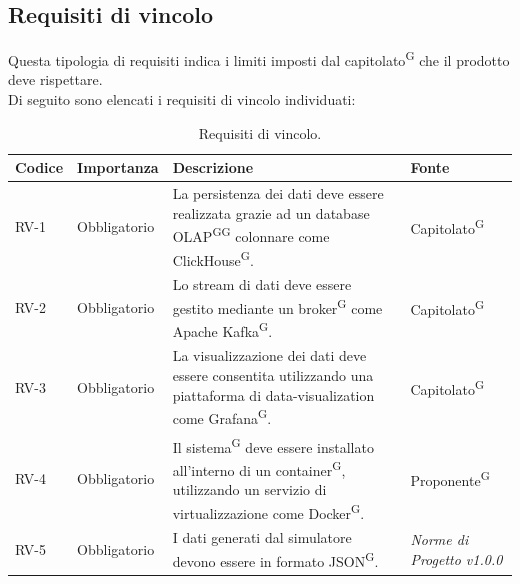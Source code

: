 \documentclass[8pt]{article}
\newcommand{\glossterm}[1]{#1\textsuperscript{G}} %
\begin{document}
\subsection{Requisiti di vincolo}
Questa tipologia di requisiti indica i limiti imposti dal \glossterm{capitolato} che il prodotto deve rispettare. \\
Di seguito sono elencati i requisiti di vincolo individuati:
\begin{longtable}{|>{\centering\arraybackslash}p{1.2cm}|>{\centering\arraybackslash}p{2cm}|>{\centering\arraybackslash}p{8.5cm}|>{\centering\arraybackslash}p{3cm}|}
    \hline
    \rowcolor{white}
    \textbf{Codice} & \textbf{Importanza} & \textbf{Descrizione} & \textbf{Fonte} \\
		\hline
    \endfirsthead
    \rowcolor{white}
    \caption{Requisiti di vincolo.}
	\label{table:Requisiti di vincolo}
    \endlastfoot
            RV-1 & Obbligatorio & La persistenza dei dati deve essere realizzata grazie ad un \glossterm{database \glossterm{OLAP}} colonnare come \glossterm{ClickHouse}. & \glossterm{Capitolato} \\ \hline
            RV-2 & Obbligatorio & Lo stream di dati deve essere gestito mediante un \glossterm{broker} come Apache \glossterm{Kafka}. & \glossterm{Capitolato} \\ \hline
            RV-3 & Obbligatorio & La visualizzazione dei dati deve essere consentita utilizzando una piattaforma di data-visualization come \glossterm{Grafana}. & \glossterm{Capitolato} \\ \hline
            RV-4 & Obbligatorio & Il \glossterm{sistema} deve essere installato all'interno di un \glossterm{container}, utilizzando un servizio di virtualizzazione come \glossterm{Docker}. & \glossterm{Proponente} \\ \hline
            RV-5 & Obbligatorio & I dati generati dal simulatore devono essere in formato \glossterm{JSON}. & \textit{Norme di Progetto v1.0.0} \\ \hline
\end{longtable}
\end{document}
